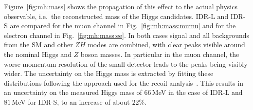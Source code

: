 Figure~\ref{fig:mh:mass} shows the propagation of this effect to the actual physics observable, i.e.\ the reconstructed mass of the Higgs candidates. IDR-L and IDR-S are compared for the muon channel in Fig.~\ref{fig:mh:mass:mumu} and for the electron channel in Fig.~\ref{fig:mh:mass:ee}. In both cases signal and all backgrounds from the SM and other $ZH$ modes are combined, with clear peaks visible around the nominal Higgs and $Z$ boson masses. In particular in the muon channel, the worse momentum resolution of the small detector leads to the peaks being visibly wider. The uncertainty on the Higgs mass is extracted by fitting these distributions following the approach used for the recoil analysis~\cite{Yan:2016xyx}. This results in an uncertainty on the measured Higgs mass of $66$\,MeV in the case of IDR-L and $81$\,MeV for IDR-S, to an increase of about $22\%$.

